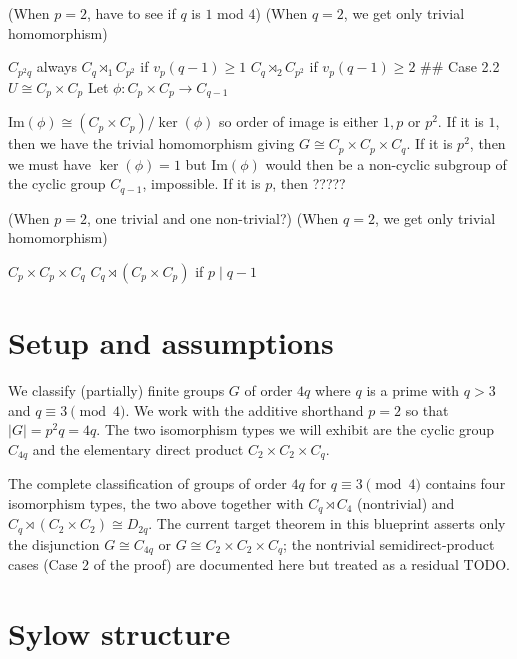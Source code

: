 (When $p = 2$, have to see if $q$ is $1$ mod $4$)
(When $q = 2$, we get only trivial homomorphism)

$C_{p^2q}$ always
$C_q \rtimes_1 C_{p^2}$ if $v_p(q - 1) \geq 1$
$C_q \rtimes_2 C_{p^2}$ if $v_p(q - 1) \geq 2$
## Case 2.2 $U \cong C_p \times C_p$
Let $\phi : C_p \times C_p \rightarrow C_{q-1}$

$\text{Im}(\phi) \cong (C_p \times C_p) / \ker(\phi)$ so order of image is either $1, p$ or $p^2$. If it is $1$, then we have the trivial homomorphism giving $G \cong C_p \times C_p \times C_{q}$. If it is $p^2$, then we must have $\ker(\phi) = 1$ but $\text{Im}(\phi)$ would then be a non-cyclic subgroup of the cyclic group $C_{q-1}$, impossible. If it is $p$, then ?????

(When $p = 2$, one trivial and one non-trivial?)
(When $q = 2$, we get only trivial homomorphism)

$C_p \times C_p \times C_q$
$C_q \rtimes (C_p \times C_p)$ if $p \mid q - 1$




\section{Setup and assumptions}

We classify (partially) finite groups $G$ of order $4q$ where $q$ is a prime with
$q > 3$ and $q \equiv 3 \pmod 4$. We work with the additive shorthand $p = 2$ so
that $|G| = p^2 q = 4q$. The two isomorphism types we will exhibit are the
cyclic group $C_{4q}$ and the elementary direct product
$C_2 \times C_2 \times C_q$.

\begin{remark}
    The complete classification of groups of order $4q$ for $q \equiv 3
    \pmod 4$ contains four isomorphism types, the two above together with
    $C_q \rtimes C_4$ (nontrivial) and $C_q \rtimes (C_2 \times C_2) \cong
    D_{2q}$. The current target theorem in this blueprint asserts only the
    disjunction $G \cong C_{4q}$ or $G \cong C_2 \times C_2 \times C_q$; the
    nontrivial semidirect-product cases (Case 2 of the proof) are documented
    here but treated as a residual TODO.
\end{remark}

\section{Sylow structure}

